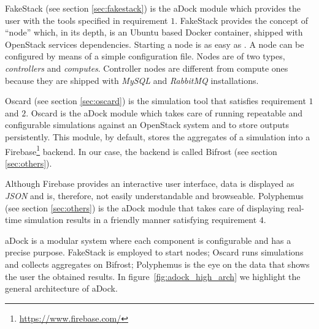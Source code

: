 FakeStack (see section \ref{sec:fakestack}) is the aDock module which provides the user with the tools specified in requirement $1$. FakeStack provides the concept of ``node'' which, in its depth, is an Ubuntu based Docker container, shipped with OpenStack services dependencies. Starting a node is as easy as . A node can be configured by means of a simple configuration file. Nodes are of two types, \textit{controllers} and \textit{computes}. Controller nodes are different from compute ones because they are shipped with \textit{MySQL} and \textit{RabbitMQ} installations.

Oscard (see section \ref{sec:oscard}) is the simulation tool that satisfies requirement $1$ and $2$. Oscard is the aDock module which takes care of running repeatable and configurable simulations against an OpenStack system and to store outputs persistently. This module, by default, stores the aggregates of a simulation into a Firebase\footnote{\url{https://www.firebase.com/}} backend. In our case, the backend is called Bifrost (see section \ref{sec:others}).

Although Firebase provides an interactive user interface, data is displayed as \textit{JSON} and is, therefore, not easily understandable and browseable. Polyphemus (see section \ref{sec:others}) is the aDock module that takes care of displaying real-time simulation results in a friendly manner satisfying requirement $4$.

aDock is a modular system where each component is configurable and has a precise purpose. FakeStack is employed to start nodes; Oscard runs simulations and collects aggregates on Bifrost; Polyphemus is the eye on the data that shows the user the obtained results.
In figure~\ref{fig:adock_high_arch} we highlight the general architecture of aDock.

